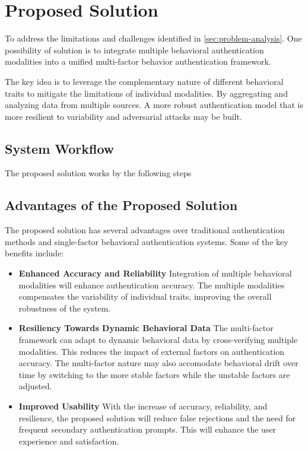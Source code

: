 \section{Proposed Solution}

To address the limitations and challenges identified in \ref{sec:problem-analysis}. One possibility of solution is to integrate multiple behavioral authentication modalities into a unified multi-factor behavior authentication framework.

The key idea is to leverage the complementary nature of different behavioral traits to mitigate the limitations of individual modalities. By aggregating and analyzing data from multiple sources. A more robust authentication model that is more resilient to variability and adversarial attacks may be built.

\subsection{System Workflow}
The proposed solution works by the following steps

\subsection{Advantages of the Proposed Solution}

The proposed solution has several advantages over traditional authentication methods and single-factor behavioral authentication systems. Some of the key benefits include:

\begin{itemize}
    \item \textbf{Enhanced Accuracy and Reliability}
    Integration of multiple behavioral modalities will enhance authentication accuracy. The multiple modalities compensates the variability of individual traits, improving the overall robustness of the system.

    \item \textbf{Resiliency Towards Dynamic Behavioral Data}
    The multi-factor framework can adapt to dynamic behavioral data by cross-verifying multiple modalities. This reduces the impact of external factors on authentication accuracy. The multi-factor nature may also accomodate behavioral drift over time by switching to the more stable factors while the unstable factors are adjusted.
    
    \item \textbf{Improved Usability}
    With the increase of accuracy, reliability, and resilience, the proposed solution will reduce false rejections and the need for frequent secondary authentication prompts. This will enhance the user experience and satisfaction.

\end{itemize}

